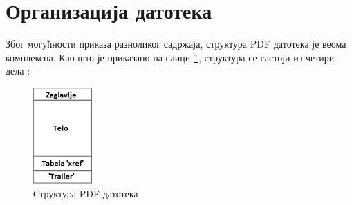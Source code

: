 \documentclass[12pt,oneside]{memoir}
\begin{document}
\section{Организација датотека}
\label{sec:organiyacijaDatotekaPDF}

Због могућности приказа разноликог садржаја, структура PDF датотека је веома комплексна. Као што је приказано на слици \ref{fig:pdfStruktura1}, структура се састоји из четири дела \cite{PDFDoc, introToPdf, basicStrPdf}:

\begin{figure}[!ht]
\centering
\includegraphics[width=0.2\textwidth]{pdfStruktura1.png}
\caption{Структура PDF датотека}
\label{fig:pdfStruktura1}
\end{figure}
\end{document}
